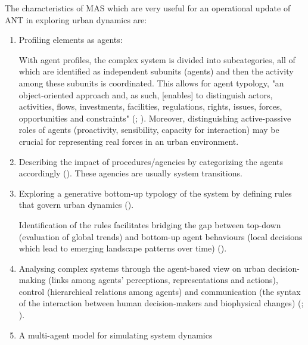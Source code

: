 \documentclass[11pt]{report}
\begin{document}
The characteristics of MAS which are very useful for an operational update of ANT in exploring urban dynamics are:

\begin{enumerate}
\item Profiling elements as agents: 

With agent profiles, the complex system is divided into subcategories, all of which are identified as independent subunits (agents) and then the activity among these subunits is coordinated. This allows for agent typology, "an object-oriented approach and, as such, [enables] to distinguish actors, activities, flows, investments, facilities, regulations, rights, issues, forces, opportunities and constraints" (\href{Hopkins}{\citealt{hopkins_structure_1999}}; \href{Saarloos}{\citealt{saarloos_multi-agent_2008}}). 
Moreover, distinguishing active-passive roles of agents (proactivity, sensibility, capacity for interaction) may be crucial for representing real forces in an urban environment.
 
\item Describing the impact of procedures/agencies by categorizing the agents accordingly (\href{Arsanjani}{\cite{arsanjani_spatiotemporal_2013}}). These agencies are usually system transitions.

\item Exploring a generative bottom-up typology of the system by defining rules that govern urban dynamics (\href{Bretagnolle}{\cite{bretagnolle_simulating_2010}}).

Identification of the rules facilitates bridging the gap between top-down (evaluation of global trends) and bottom-up agent behaviours (local decisions which lead to emerging landscape patterns over time) (\href{Bone}{\citealt{bone_modeling---middle:_2011}}). 

\item Analysing complex systems through the agent-based view on urban decision-making (links among agents' perceptions, representations and actions), control (hierarchical relations among agents) and communication (the syntax of the interaction between human decision-makers and biophysical changes) (\href{Bousquet}{\citealt{bousquet_multi-agent_2004}}; \href{Brown}{\citealt{brown_exurbia_2008}}).

\item A multi-agent model for simulating system dynamics


\end{enumerate}
\end{document}
